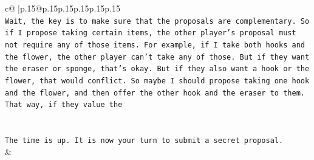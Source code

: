 \documentclass{article}
\begin{document}
{\begin{supertabular}{c@{$\;$}|p{.15\linewidth}@{}p{.15\linewidth}p{.15\linewidth}p{.15\linewidth}p{.15\linewidth}p{.15\linewidth}}
{{{\\ 
\texttt{Wait, the key is to make sure that the proposals are complementary. So if I propose taking certain items, the other player's proposal must not require any of those items. For example, if I take both hooks and the flower, the other player can't take any of those. But if they want the eraser or sponge, that's okay. But if they also want a hook or the flower, that would conflict. So maybe I should propose taking one hook and the flower, and then offer the other hook and the eraser to them. That way, if they value the} \\
\\ 
\\ 
\texttt{The time is up. It is now your turn to submit a secret proposal.} \\
            }
        }
    }
    & \\ \\


\end{supertabular}}
\end{document}
